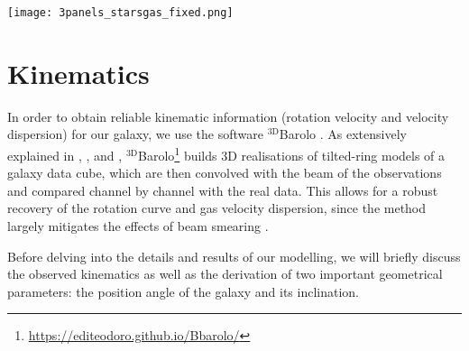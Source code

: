 \documentclass[fleqn,usenatbib]{mnras}
\begin{document}
\begin{figure*}
    \centering
    \texttt{[image: 3panels\_starsgas\_fixed.png]}
    \caption{\textit{Left:} Stellar image of AGC~114905 with the total H\,{\sc i} contours overlaid. The contours are at 1, 2, 4$\times 10^{20}$~atoms cm$^{-2}$, the noise level is 4.1$\times 10^{19}$ atoms~cm$^{-2}$. \textit{Middle:} Total H\,{\sc i} intensity map; contours as in the previous panel. The grey ellipse shows the beam of our data. \textit{Right:} Stellar (orange) and gas (blue, includes helium correction) surface mass density profiles of AGC~114905. The dashed black lines on top show the fits to the distributions used to obtain the stellar and gas circular speeds (see Section~ \ref{sec:massmodels}).}
    \label{fig:sds}
\end{figure*}



\section{Kinematics}
\label{sec:kinematics}

In order to obtain reliable kinematic information (rotation velocity and velocity dispersion) for our galaxy, we use the software $\mathrm{^{3D}}$Barolo \citep{barolo}. As extensively explained in \citet{barolo}, \citet{enrico_z1}, and \citet{iorio}, $\mathrm{^{3D}}$Barolo\footnote{\url{https://editeodoro.github.io/Bbarolo/}} builds 3D realisations of tilted-ring models of a galaxy data cube, which are then convolved with the beam of the observations and compared channel by channel with the real data. This allows for a robust recovery of the rotation curve and gas velocity dispersion, since the method largely mitigates the effects of beam smearing \citep{bosma1978,begeman,swatersPhD,barolo}.

Before delving into the details and results of our modelling, we will briefly discuss the observed kinematics as well as the derivation of two important geometrical parameters: the position angle of the galaxy and its inclination.
\end{document}
